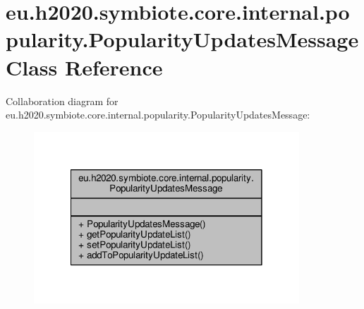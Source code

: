 \hypertarget{classeu_1_1h2020_1_1symbiote_1_1core_1_1internal_1_1popularity_1_1PopularityUpdatesMessage}{}\section{eu.\+h2020.\+symbiote.\+core.\+internal.\+popularity.\+Popularity\+Updates\+Message Class Reference}
\label{classeu_1_1h2020_1_1symbiote_1_1core_1_1internal_1_1popularity_1_1PopularityUpdatesMessage}


Collaboration diagram for eu.\+h2020.\+symbiote.\+core.\+internal.\+popularity.\+Popularity\+Updates\+Message\+:\nopagebreak
\begin{figure}[H]
\begin{center}
\leavevmode
\includegraphics[width=282pt]{classeu_1_1h2020_1_1symbiote_1_1core_1_1internal_1_1popularity_1_1PopularityUpdatesMessage__coll__graph}
\end{center}
\end{figure}
